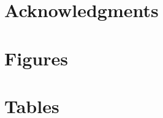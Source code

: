 \documentclass[10pt]{article}
\begin{document}






\section*{Acknowledgments}




\vspace{1cm}
\section*{Figures}



\section*{Tables}
\end{document}
